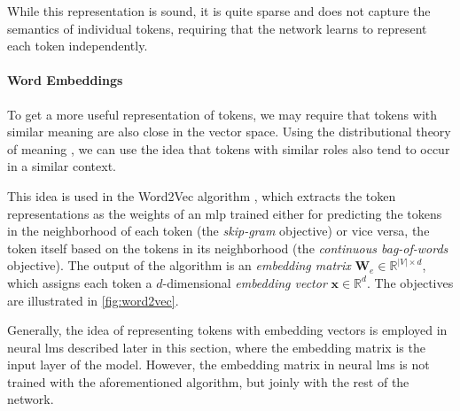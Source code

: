 While this representation is sound, it is quite sparse and does not capture the semantics of individual tokens, requiring that the network learns to represent each token independently.

\paragraph{Word Embeddings} To get a more useful representation of tokens, we may require that tokens with similar meaning are also close in the vector space. Using the distributional theory of meaning , we can use the idea that tokens with similar roles also tend to occur in a similar context.

This idea is used in the Word2Vec algorithm \cite{mikolov2013distributed}, which extracts the token representations as the weights of an \ac{mlp} trained either for predicting the tokens in the neighborhood of each token (the \emph{skip-gram} objective) or vice versa, the token itself based on the tokens in its neighborhood (the \emph{continuous bag-of-words} objective). The output of the algorithm is an \textit{embedding matrix} $\mathbf{W}_e \in \mathbb{R}^{|V|\times d}$, which assigns each token a $d$-dimensional \textit{embedding vector} $\mathbf{x} \in \mathbb{R}^{d}$. The objectives are illustrated in \autoref{fig:word2vec}.

Generally, the idea of representing tokens with embedding vectors is employed in neural \acp{lm} described later in this section, where the embedding matrix is the input layer of the model. However, the embedding matrix in neural \acp{lm} is not trained with the aforementioned algorithm, but joinly with the rest of the network.

